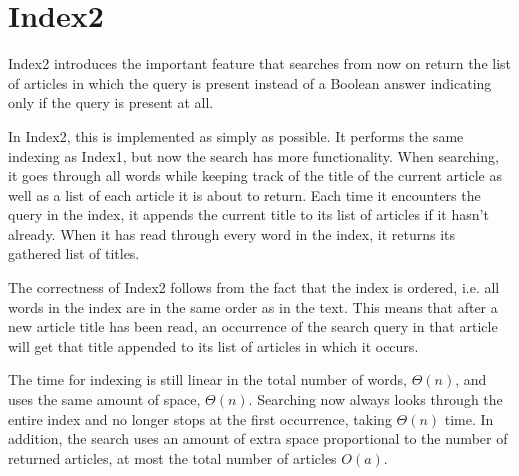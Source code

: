 \section{Index2}
\label{section:Index2}

Index2 introduces the important feature that searches from now on return the list of articles in which the query is present instead of a Boolean answer indicating only if the query is present at all. 

In Index2, this is implemented as simply as possible. It performs the same indexing as Index1, but now the search has more functionality. When searching, it goes through all words while keeping track of the title of the current article as well as a list of each article it is about to return. Each time it encounters the query in the index, it appends the current title to its list of articles if it hasn't already. When it has read through every word in the index, it returns its gathered list of titles. 

The correctness of Index2 follows from the fact that the index is ordered, i.e. all words in the index are in the same order as in the text. This means that after a new article title has been read, an occurrence of the search query in that article will get that title appended to its list of articles in which it occurs. 

The time for indexing is still linear in the total number of words, $\Theta(n)$, and uses the same amount of space, $\Theta(n)$. Searching now always looks through the entire index and no longer stops at the first occurrence, taking $\Theta(n)$ time. In addition, the search uses an amount of extra space proportional to the number of returned articles, at most the total number of articles $O(a)$. 
